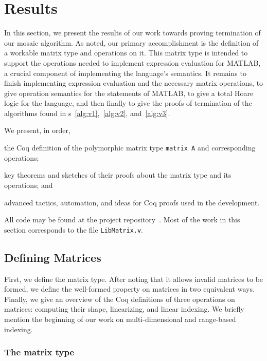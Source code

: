 \documentclass[11pt,conference]{IEEEtran}
\newcommand{\matlab}{MATLAB}
\newcommand{\mmatlab}{\textmu\matlab}
\theoremstyle{plain} %
\theoremstyle{definition}
\theoremstyle{remark}
\begin{document}
\section{Results}\label{S:results}

In this section, we present the results of our work towards proving termination
of our mosaic algorithm. As noted, our primary accomplishment is the definition
of a workable matrix type and operations on it. This matrix type is intended to
support the operations needed to implement expression evaluation for \mmatlab, a
crucial component of implementing the language's semantics. It remains to finish
implementing expression evaluation and the necessary matrix operations, to give
operation semantics for the statements of \mmatlab, to give a total Hoare logic
for the language, and then finally to give the proofs of termination of the
algorithms found in \figurename{s}~\ref{alg:v1},~\ref{alg:v2}, and~\ref{alg:v3}.

We present, in order,
\begin{inlist}
\item the Coq definition of the polymorphic matrix type \texttt{matrix A} and
    corresponding operations;
\item key theorems and sketches of their proofs about the matrix type and its
    operations; and
\item advanced tactics, automation, and ideas for Coq proofs used in the
    development.
\end{inlist}

All code may be found at the project repository~\cite{zelda_mosaic_proof}. Most
of the work in this section corresponds to the file \texttt{LibMatrix.v}.

\subsection{Defining Matrices}\label{S:matrix_defn}

First, we define the matrix type. After noting that it allows invalid matrices
to be formed, we define the well-formed property on matrices in two equivalent
ways. Finally, we give an overview of the Coq definitions of three operations on
matrices: computing their shape, linearizing, and linear indexing. We briefly
mention the beginning of our work on multi-dimensional and range-based indexing.

\subsubsection{The matrix type}
\end{document}
